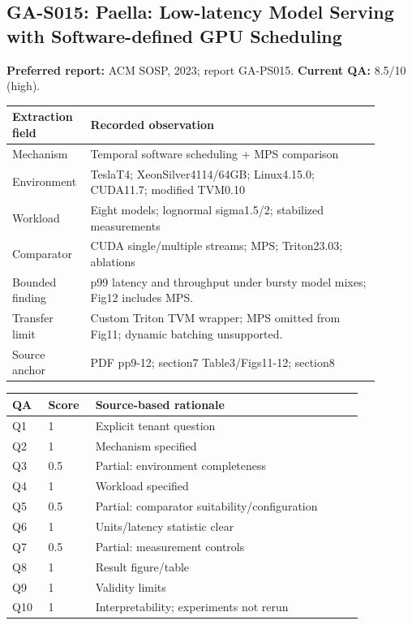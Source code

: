 \subsection{GA-S015: Paella: Low-latency Model Serving with Software-defined GPU Scheduling}
\textbf{Preferred report:} ACM SOSP, 2023; report GA-PS015. \textbf{Current QA:} 8.5/10 (high).
\begin{longtable}{P{0.15\linewidth}P{0.75\linewidth}}
\toprule Extraction field & Recorded observation\\\midrule\endhead
Mechanism & Temporal software scheduling + MPS comparison\\
Environment & TeslaT4; XeonSilver4114/64GB; Linux4.15.0; CUDA11.7; modified TVM0.10\\
Workload & Eight models; lognormal sigma1.5/2; stabilized measurements\\
Comparator & CUDA single/multiple streams; MPS; Triton23.03; ablations\\
Bounded finding & p99 latency and throughput under bursty model mixes; Fig12 includes MPS.\\
Transfer limit & Custom Triton TVM wrapper; MPS omitted from Fig11; dynamic batching unsupported.\\
Source anchor & PDF pp9-12; section7 Table3/Figs11-12; section8\\
\bottomrule\end{longtable}
\begin{longtable}{P{0.09\linewidth}P{0.10\linewidth}P{0.67\linewidth}}
\toprule QA & Score & Source-based rationale\\\midrule\endhead
Q1 & 1 & Explicit tenant question\\
Q2 & 1 & Mechanism specified\\
Q3 & 0.5 & Partial: environment completeness\\
Q4 & 1 & Workload specified\\
Q5 & 0.5 & Partial: comparator suitability/configuration\\
Q6 & 1 & Units/latency statistic clear\\
Q7 & 0.5 & Partial: measurement controls\\
Q8 & 1 & Result figure/table\\
Q9 & 1 & Validity limits\\
Q10 & 1 & Interpretability; experiments not rerun\\
\bottomrule\end{longtable}

